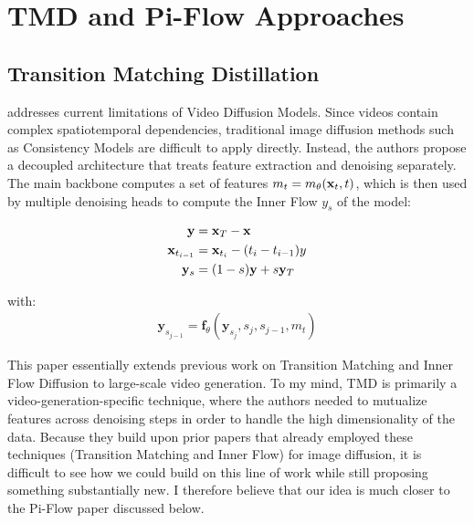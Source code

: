 \section{TMD and Pi-Flow Approaches}

\subsection{Transition Matching Distillation}
\cite{nie2026transitionmatchingdistillationfast} addresses current limitations of Video Diffusion Models. Since videos contain complex spatiotemporal dependencies, traditional image diffusion methods such as Consistency Models are difficult to apply directly. Instead, the authors propose a decoupled architecture that treats feature extraction and denoising separately. \\

\noindent The main backbone computes a set of features $m_t = m_{\theta}(\mathbf{x}_t, t)$, which is then used by multiple denoising heads to compute the Inner Flow $y_s$ of the model:

\begin{align*}
    \mathbf{y} & = \mathbf{x}_T - \mathbf{x} \\
    \mathbf{x}_{t_{i-1}} & = \mathbf{x}_{t_i} - (t_i - t_{i-1})y \\
    \mathbf{y}_s & = (1 - s)\mathbf{y} + s\mathbf{y}_T
\end{align*}

\noindent with:
\begin{align*}
    \mathbf{y}_{s_{j-1}} = \mathbf{f}_{\theta}(\mathbf{y}_{s_j}, s_j, s_{j-1}, m_t)
\end{align*}

\noindent This paper essentially extends previous work on Transition Matching and Inner Flow Diffusion \cite{lipman2023flowmatchinggenerativemodeling, shaul2025transitionmatchingscalableflexible} to large-scale video generation. To my mind, TMD is primarily a video-generation-specific technique, where the authors needed to mutualize features across denoising steps in order to handle the high dimensionality of the data. Because they build upon prior papers that already employed these techniques (Transition Matching and Inner Flow) for image diffusion, it is difficult to see how we could build on this line of work while still proposing something substantially new. I therefore believe that our idea is much closer to the Pi-Flow paper discussed below.

